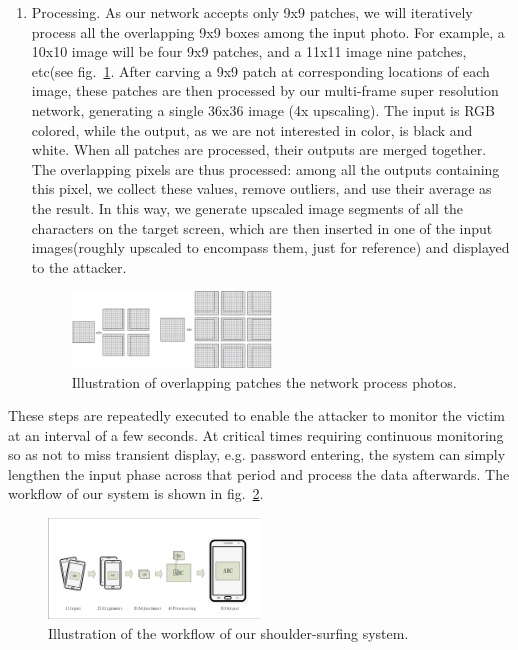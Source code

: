 \begin{enumerate}
\item Processing. As our network accepts only 9x9 patches, we will iteratively process all the overlapping 9x9 boxes among the input photo. For example, a 10x10 image will be four 9x9 patches, and a 11x11 image nine patches, etc(see fig.~\ref{fig-patches}. After carving a 9x9 patch at corresponding locations of each image, these patches are then processed by our multi-frame super resolution network, generating a single 36x36 image (4x upscaling). The input is RGB colored, while the output, as we are not interested in color, is black and white. When all patches are processed, their outputs are merged together. The overlapping pixels are thus processed: among all the outputs containing this pixel, we collect these values, remove outliers, and use their average as the result. In this way, we generate upscaled image segments of all the characters on the target screen, which are then inserted in one of the input images(roughly upscaled to encompass them, just for reference) and displayed to the attacker.

\begin{figure}
 \centering
    \includegraphics[width=0.5\textwidth]{./pic/patches.jpg}
    \caption{Illustration of overlapping patches the network process photos.}
    \label{fig-patches}
\end{figure}

\end{enumerate}

These steps are repeatedly executed to enable the attacker to monitor the victim at an interval of a few seconds. At critical times requiring continuous monitoring so as not to miss transient display, e.g. password entering, the system can simply lengthen the input phase across that period and process the data afterwards. The workflow of our system is shown in fig.~\ref{fig-workflow}.
\begin{figure}
 \centering
    \includegraphics[width=0.5\textwidth]{./pic/workflow.pdf}
    \caption{Illustration of the workflow of our shoulder-surfing system.}
    \label{fig-workflow}
\end{figure}

